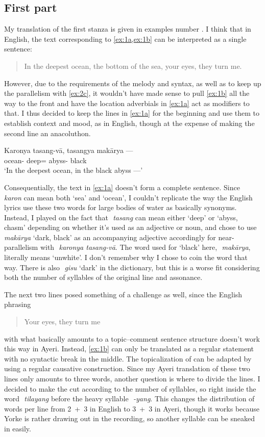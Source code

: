 \documentclass[12pt,paper=a4]{scrartcl}
\newcommand{\zwsp}{\mbox{​}} %
\newcommand{\rayr}[2]{\zwsp\smash{{\Tagati #1}} \emph{#2}} %
\newcommand{\xayr}[3]{\zwsp\smash{\Tagati #1} \emph{#2} `#3'} %
\begin{document}
\subsection{First part}

My translation of the first stanza is given in examples number
. I think that in English, the text corresponding to
\cref{ex:1a,ex:1b} can be interpreted as a single sentence: \blockquote{In the
deepest ocean, the bottom of the sea, your eyes, they turn me.} However, due to
the requirements of the melody and syntax, as well as to keep up the
parallelism with \cref{ex:2c}, it wouldn't have made sense to pull \cref{ex:1b}
all the way to the front and have the location adverbials in \cref{ex:1a} act
as modifiers to that. I thus decided to keep the lines in \cref{ex:1a} for the
beginning and use them to establish context and mood, as in English, though at
the expense of making the second line an anacoluthon.

\begin{exe}
\ex \label{ex:1a}
	\gll Karonya tasang-vā, tasangya makārya --- \\
		ocean-\Loc{} deep=\Sup{} abyss-\Loc{} black \\
	\trans `In the deepest ocean, in the black abyss ---'
\end{exe}

Consequentially, the text in \cref{ex:1a} doesn't form a complete sentence.
Since \rayr{kronF}{karon} can mean both `sea' and `ocean', I couldn't replicate
the way the English lyrics use these two words for large bodies of water as
basically synonyms. Instead, I played on the fact that \rayr{tsNF}{tasang} can
mean either `deep' or `abyss, chasm' depending on whether it's used as an
adjective or noun, and chose to use \xayr{mkaarFy}{makārya}{dark, black} as an
accompanying adjective accordingly for near-parallelism with \rayr{kronY
tsNF/vaa}{karonya tasang-vā}. The word used for `black' here,
\rayr{mkaarFy}{makārya}, literally means `unwhite'. I don't remember why I
chose to coin the word that way. There is also \xayr{gisu}{gisu}{dark} in the
dictionary, but this is a worse fit considering both the number of syllables of
the original line and assonance.

The next two lines posed something of a challenge as well, since the English
phrasing \blockquote{Your eyes, they turn me} with what basically amounts to a
topic--comment sentence structure doesn't work this way in Ayeri. Instead,
\cref{ex:1b} can only be translated as a regular statement with no syntactic
break in the middle. The topicalization of  can be adapted by
using a regular causative construction. Since my Ayeri translation of these two
lines only amounts to three words, another question is where to divide the
lines. I decided to make the cut according to the number of syllables, so right
inside the word \rayr{tilyNF}{tilayang} before the heavy syllable
\rayr{/yNF}{-yang}. This changes the distribution of words per line from 2~+~3
in English to 3~+~3 in Ayeri, though it works because Yorke is rather drawing
out  in the recording, so another syllable can be sneaked
in easily.
\end{document}
